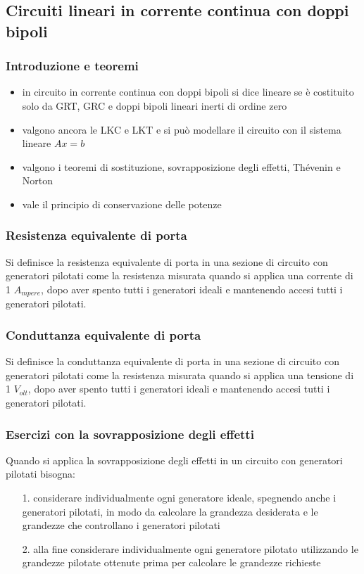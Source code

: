 \documentclass[a4paper]{article}
\begin{document}
\subsection{Circuiti lineari in corrente continua con doppi bipoli}
\subsubsection*{Introduzione e teoremi}
\begin{itemize}
	\item in circuito in corrente continua con doppi bipoli si dice lineare se è costituito solo da GRT, GRC e doppi bipoli lineari
	inerti di ordine zero
	\item valgono ancora le LKC e LKT e si può modellare il circuito con il sistema lineare \(Ax = b\)
	\item valgono i teoremi di sostituzione, sovrapposizione degli effetti, Thévenin e Norton
	\item vale il principio di conservazione delle potenze
\end{itemize}

\subsubsection*{Resistenza equivalente di porta}
Si definisce la resistenza equivalente di porta in una sezione di circuito con generatori pilotati come la resistenza misurata quando
si applica una corrente di 1 \(A_{mpere}\), dopo aver spento tutti i generatori ideali e mantenendo accesi tutti i generatori pilotati.

\subsubsection*{Conduttanza equivalente di porta}
Si definisce la conduttanza equivalente di porta in una sezione di circuito con generatori pilotati come la resistenza misurata quando
si applica una tensione di 1 \(V_{olt}\), dopo aver spento tutti i generatori ideali e mantenendo accesi tutti i generatori pilotati.

\subsubsection*{Esercizi con la sovrapposizione degli effetti}
Quando si applica la sovrapposizione degli effetti in un circuito con generatori pilotati bisogna:
\begin{itemize}
	\item[1.] considerare individualmente ogni generatore ideale, spegnendo anche i generatori pilotati, in modo da calcolare la
	grandezza desiderata e le grandezze che controllano i generatori pilotati
	\item[2.] alla fine considerare individualmente ogni generatore pilotato utilizzando le grandezze pilotate ottenute prima per
	calcolare le grandezze richieste
\end{itemize}
\end{document}
